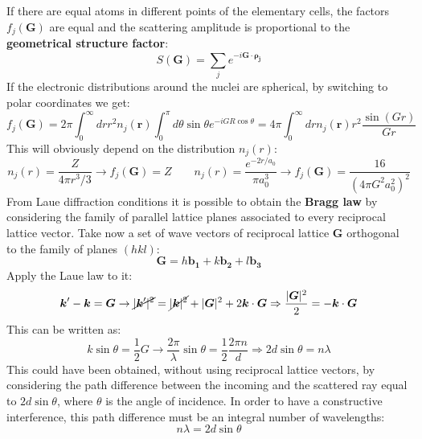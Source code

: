 \documentclass[10.75pt,a4paper,openright,bottom=2cm]{article}
\renewcommand{\Vec}[1]{\boldsymbol{#1}}
\begin{document}
If there are equal atoms in different points of the elementary cells, the factors $f_j(\Vec{G})$ are equal and the scattering amplitude is proportional to the \textbf{geometrical structure factor}:
\[
S(\Vec{G})=\sum_je^{-i\Vec{G}\cdot\Vec{\rho_j}}
\]
If the electronic distributions around the nuclei are spherical, by switching to polar coordinates we get:
\[
f_j(\Vec{G})=2\pi\int_0^\infty drr^2n_j(\Vec{r})\int_0^\pi d\theta\sin\theta e^{-iGR\cos\theta}=4\pi\int_0^\infty drn_j(\Vec{r})r^2\frac{\sin(Gr)}{Gr}
\]
This will obviously depend on the distribution $n_j(r)$:
\[
n_j(r)=\frac{Z}{4\pi r^3/3}\to f_j(\Vec{G})=Z \qquad n_j(r)=\frac{e^{-2r/a_0}}{\pi a_0^3}\to f_j(\Vec{G})=\frac{16}{(4\pi G^2a_0^2)^2}
\]
From Laue diffraction conditions it is possible to obtain the \textbf{Bragg law} by considering the family of parallel lattice planes associated to every reciprocal lattice vector. Take now a set of wave vectors of reciprocal lattice $\Vec{G}$ orthogonal to the family of planes $(hkl)$:
\[
\Vec{G}=h\Vec{b_1}+k\Vec{b_2}+l\Vec{b_3}
\]
Apply the Laue law to it:
\[
\Vec{k}'-\Vec{k}=\Vec{G}\to\cancel{|\Vec{k}'|^2}=\cancel{|\Vec{k}|^2}+|\Vec{G}|^2+2\Vec{k}\cdot\Vec{G}\Rightarrow\frac{|\Vec{G}|^2}{2}=-\Vec{k}\cdot\Vec{G}
\]
This can be written as:
\[
k\sin\theta=\frac{1}{2}G\to\frac{2\pi}{\lambda}\sin\theta=\frac{1}{2}\frac{2\pi n}{d}\Rightarrow2d\sin\theta=n\lambda
\]
This could have been obtained, without using reciprocal lattice vectors, by considering the path difference between the incoming and the scattered ray equal to $2d\sin\theta$, where $\theta$ is the angle of incidence. In order to have a constructive interference, this path difference must be an integral number of wavelengths:
\[
n\lambda=2d\sin\theta
\]
\end{document}

